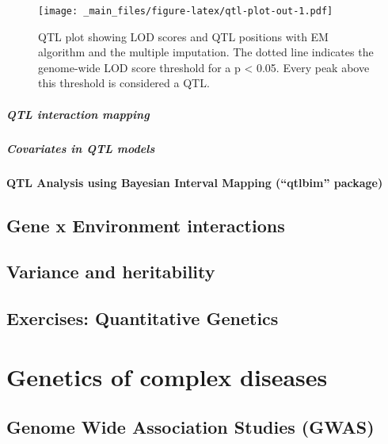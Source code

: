 \documentclass[12pt,]{krantz}
\let\oldparagraph\paragraph
\renewcommand{\paragraph}[1]{\oldparagraph{#1}\mbox{}}
\theoremstyle{definition}
\theoremstyle{definition}
\theoremstyle{definition}
\theoremstyle{remark}
\begin{document}
\begin{figure}
\centering
\texttt{[image: \_main\_files/figure-latex/qtl-plot-out-1.pdf]}
\caption{\label{fig:qtl-plot-out}QTL plot showing LOD scores and QTL
positions with EM algorithm and the multiple imputation. The dotted line
indicates the genome-wide LOD score threshold for a p \textless{} 0.05.
Every peak above this threshold is considered a QTL.}
\end{figure}

\paragraph{QTL interaction mapping}\label{qtl-interaction-mapping}

\paragraph{Covariates in QTL models}\label{covariates-in-qtl-models}

\subsubsection{\texorpdfstring{QTL Analysis using Bayesian Interval
Mapping (``qtlbim''
package)}{QTL Analysis using Bayesian Interval Mapping (qtlbim package)}}\label{qtl-analysis-using-bayesian-interval-mapping-qtlbim-package}

\section{Gene x Environment
interactions}\label{gene-x-environment-interactions}

\section{Variance and heritability}\label{variance-and-heritability}

\section*{Exercises: Quantitative
Genetics}\label{exercises-quantitative-genetics}


\chapter{Genetics of complex
diseases}\label{genetics-of-complex-diseases}

\section{Genome Wide Association Studies
(GWAS)}\label{genome-wide-association-studies-gwas}
\end{document}
